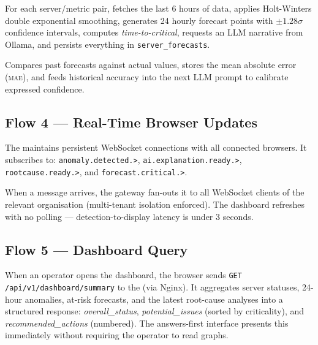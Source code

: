 \begin{description}[leftmargin=2cm]
  \item[Forecast loop (every 30 min)] For each server/metric pair, fetches the
    last 6 hours of data, applies Holt-Winters double exponential smoothing,
    generates 24 hourly forecast points with $\pm 1.28\sigma$ confidence
    intervals, computes \textit{time-to-critical}, requests an LLM narrative
    from Ollama, and persists everything in \texttt{server\_forecasts}.
  \item[Evaluation loop (every 60 min)] Compares past forecasts against actual
    values, stores the mean absolute error (\textsc{mae}), and feeds historical
    accuracy into the next LLM prompt to calibrate expressed confidence.
\end{description}

\subsection{Flow 4 — Real-Time Browser Updates}

The  maintains persistent WebSocket connections with
all connected browsers. It subscribes to:
\texttt{anomaly.detected.>}, \texttt{ai.explanation.ready.>},
\texttt{rootcause.ready.>}, and \texttt{forecast.critical.>}.

When a message arrives, the gateway fan-outs it to all WebSocket clients of
the relevant organisation (multi-tenant isolation enforced). The dashboard
refreshes with no polling — detection-to-display latency is under 3 seconds.

\subsection{Flow 5 — Dashboard Query}

When an operator opens the dashboard, the browser sends
\texttt{GET /api/v1/dashboard/summary} to the  (via Nginx).
It aggregates server statuses, 24-hour anomalies, at-risk forecasts, and the
latest root-cause analyses into a structured response:
\textit{overall\_status}, \textit{potential\_issues} (sorted by criticality),
and \textit{recommended\_actions} (numbered). The answers-first interface
presents this immediately without requiring the operator to read graphs.

